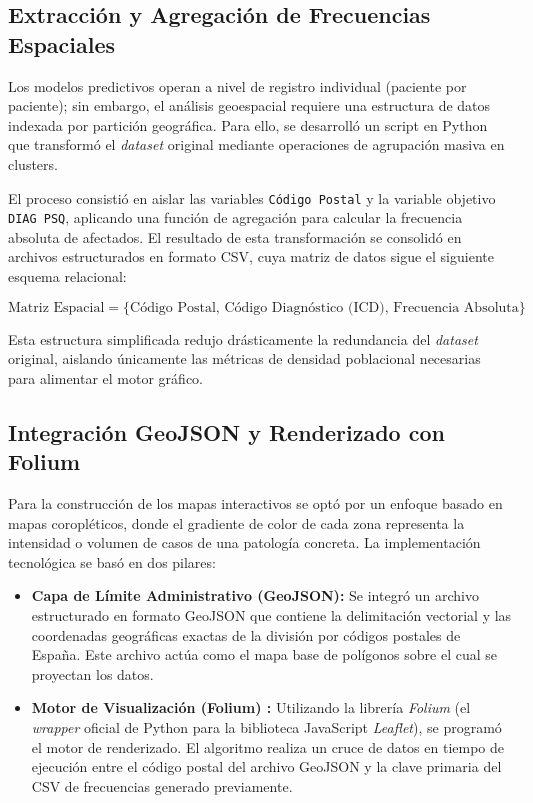 \documentclass[12pt,a4paper,onecolumn,oneside]{report}
\begin{document}
\subsection{Extracción y Agregación de Frecuencias Espaciales}
Los modelos predictivos operan a nivel de registro individual (paciente por paciente); sin embargo, el análisis geoespacial requiere una estructura de datos indexada por partición geográfica. Para ello, se desarrolló un script en Python que transformó el \textit{dataset} original mediante operaciones de agrupación masiva en clusters.

El proceso consistió en aislar las variables \texttt{Código Postal} y la variable objetivo \texttt{DIAG PSQ}, aplicando una función de agregación para calcular la frecuencia absoluta de afectados. El resultado de esta transformación se consolidó en archivos estructurados en formato CSV, cuya matriz de datos sigue el siguiente esquema relacional:

\begin{equation}
\text{Matriz Espacial} = \{ \text{Código Postal}, \, \text{Código Diagnóstico (ICD)}, \, \text{Frecuencia Absoluta} \}
\end{equation}

Esta estructura simplificada redujo drásticamente la redundancia del \textit{dataset} original, aislando únicamente las métricas de densidad poblacional necesarias para alimentar el motor gráfico.

\subsection{Integración GeoJSON y Renderizado con Folium}
Para la construcción de los mapas interactivos se optó por un enfoque basado en mapas coropléticos, donde el gradiente de color de cada zona representa la intensidad o volumen de casos de una patología concreta. La implementación tecnológica se basó en dos pilares:

\begin{itemize}
    \item \textbf{Capa de Límite Administrativo (GeoJSON):} Se integró un archivo estructurado en formato GeoJSON que contiene la delimitación vectorial y las coordenadas geográficas exactas de la división por códigos postales de España. Este archivo actúa como el mapa base de polígonos sobre el cual se proyectan los datos.
    
    \item \textbf{Motor de Visualización (Folium) \cite{folium}:} Utilizando la librería \textit{Folium} (el \textit{wrapper} oficial de Python para la biblioteca JavaScript \textit{Leaflet}), se programó el motor de renderizado. El algoritmo realiza un cruce de datos en tiempo de ejecución entre el código postal del archivo GeoJSON y la clave primaria del CSV de frecuencias generado previamente.
\end{itemize}
\end{document}
